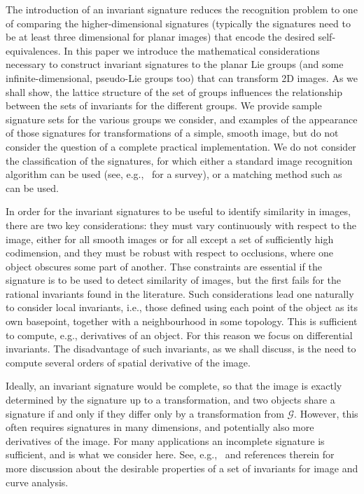 \documentclass[review,onefignum,onetabnum]{siamonline190516}
\begin{document}
The introduction of an invariant signature reduces the recognition problem to one of comparing the higher-dimensional signatures (typically the signatures need to be at least three dimensional for planar images) that encode the desired self-equivalences. In this paper we introduce the mathematical considerations necessary to construct invariant signatures to the planar Lie groups (and some infinite-dimensional, pseudo-Lie groups too) that can transform 2D images. As we shall show, the lattice structure of the set of groups influences the relationship between the sets of invariants for the different groups. We provide sample signature sets for the various groups we consider, and examples of the appearance of those signatures for transformations of a simple, smooth image, but do not consider the question of a complete practical implementation. We do not consider the classification of the signatures, for which either a standard image recognition algorithm can be used (see, e.g.,~\cite{Zhang20} for a survey), or a matching method such as~\cite{UsCurrents} can be used.

In order for the invariant signatures to be useful to identify similarity in images, there are two key considerations: they must vary continuously with respect to the image, either for all smooth images or for all except a set of sufficiently high codimension, and they must be robust with respect to occlusions, where one object obscures some part of another. Thse constraints are essential if the signature is to be used to detect similarity of images, but the first fails for the rational invariants found in the literature. Such considerations lead one naturally to consider local invariants, i.e., those defined using each point of the object as its own basepoint, together with a neighbourhood in some topology. This is sufficient to compute, e.g., derivatives of an object. For this reason we focus on differential invariants. The disadvantage of such invariants, as we shall discuss, is the need to compute several orders of spatial derivative of the image.

Ideally, an invariant signature would be complete, so that the image is exactly determined by the signature up to a transformation, and two objects share a signature if and only if they differ only by a transformation from $\mathcal{G}$. However, this often requires signatures in many dimensions, and potentially also more derivatives of the image. For many applications an incomplete signature is sufficient, and is what we consider here. See, e.g.,~\cite{UsMobius} and references therein for more discussion about the desirable properties of a set of invariants for image and curve analysis.
\end{document}
